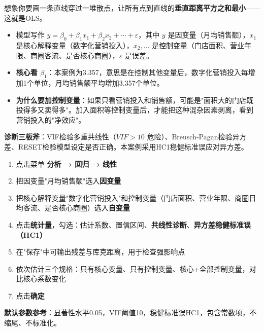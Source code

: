 \begin{algoprinciple}
想象你要画一条直线穿过一堆散点，让所有点到直线的\textbf{垂直距离平方之和最小}——这就是OLS。

\begin{itemize}
    \item 模型写作 $y=\beta_0+\beta_1 x_1+\beta_2 x_2+\cdots+\varepsilon$，其中 $y$ 是因变量（月均销售额），$x_1$ 是核心解释变量（数字化营销投入），$x_2,\ldots$ 是控制变量（门店面积、营业年限、商圈客流、是否核心商圈），$\varepsilon$ 是误差。
    \item \textbf{核心看 $\beta_1$}：本案例为3.357，意思是在控制其他变量后，数字化营销投入每增加1个单位，月均销售额平均增加3.357个单位。
    \item \textbf{为什么要加控制变量}：如果只看营销投入和销售额，可能是"面积大的门店既投得多又卖得多"。加入面积等控制变量后，才能把这种混杂因素剥离，看到营销投入的"净效应"。
\end{itemize}

\textbf{诊断三板斧}：VIF检验多重共线性（$VIF>10$ 危险）、Breusch-Pagan检验异方差、RESET检验模型设定是否正确。本案例采用HC1稳健标准误应对异方差。
\end{algoprinciple}

\begin{algosposs}
\begin{enumerate}
    \item 点击菜单 \textbf{分析 → 回归 → 线性}
    \item 把因变量"月均销售额"选入\textbf{因变量}
    \item 把核心解释变量"数字化营销投入"和控制变量（门店面积、营业年限、商圈日均客流、是否核心商圈）选入\textbf{自变量}
    \item 点击\textbf{统计量}，勾选：估计系数、置信区间、\textbf{共线性诊断}、\textbf{异方差稳健标准误（HC1）}
    \item 在"保存"中可输出残差与库克距离，用于检查强影响点
    \item 依次估计三个规格：只有核心变量、只有控制变量、核心+全部控制变量，对比核心系数变化
    \item 点击\textbf{确定}
\end{enumerate}

\textbf{默认参数参考}：显著性水平0.05，VIF阈值10，稳健标准误HC1，包含常数项，不缩尾、不标准化。
\end{algosposs}

